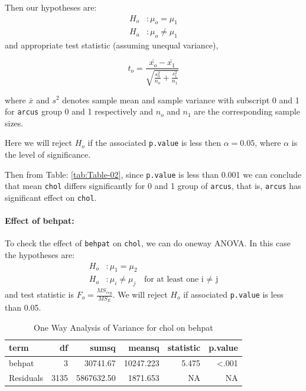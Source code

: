 \documentclass[
  12pt,
  oneside]{article}
\begin{document}
Then our hypotheses are:
\begin{align*}
H_o&: \mu_o = \mu_1 \\
H_a&: \mu_o \neq \mu_1
\end{align*}
and appropriate test statistic (assuming unequal variance),

\[
t_o = \frac{\bar{x_o} - \bar{x_1}}{\sqrt{\frac{s_o^2}{n_o} + \frac{s_1^2}{n_1}}}
\]

where \(\bar{x}\) and \(s^2\) denotes sample mean and sample variance with subscript
0 and 1 for \texttt{arcus} group 0 and 1 respectively and \(n_o\) and \(n_1\) are the corresponding sample sizes.

Here we will reject \(H_o\) if the associated \texttt{p.value} is less then \(\alpha = 0.05\), where \(\alpha\) is the level of significance.

Then from Table: \ref{tab:Table-02}, since \texttt{p.value} is less than 0.001 we can conclude that mean \texttt{chol} differs significantly for 0 and 1 group of \texttt{arcus}, that is, \texttt{arcus} has significant effect on \texttt{chol}.

\hypertarget{effect-of-behpat}{%
\paragraph{Effect of behpat:}\label{effect-of-behpat}}

To check the effect of \texttt{behpat} on \texttt{chol}, we can do oneway ANOVA. In this case the hypotheses are:
\begin{align*}
H_o&: \mu_1 = \mu_2 \\
H_a&: \mu_i \neq \mu_j \! &\text{for at least one i $\ne$ j}
\end{align*}
and test statistic is \(F_o = \frac{MS_{reg}}{MS_{E}}\). We will reject \(H_o\) if associated \texttt{p.value} is less than 0.05.

\begin{table}[H]

\caption{\label{tab:Table-03}One Way Analysis of Variance for chol on behpat}
\centering
\begin{tabular}[t]{lrrrrr}
\toprule
term & df & sumsq & meansq & statistic & p.value\\
\midrule
behpat & 3 & 30741.67 & 10247.223 & 5.475 & <.001\\
Residuals & 3135 & 5867632.50 & 1871.653 & NA & NA\\
\bottomrule
\end{tabular}
\end{table}
\end{document}
